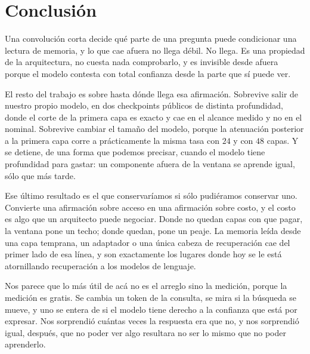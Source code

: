 \documentclass[11pt,a4paper]{article}
\begin{document}
\section{Conclusión}

Una convolución corta decide qué parte de una pregunta puede condicionar una lectura de memoria, y lo
que cae afuera no llega débil. No llega. Es una propiedad de la arquitectura, no cuesta nada
comprobarlo, y es invisible desde afuera porque el modelo contesta con total confianza desde la parte
que sí puede ver.

El resto del trabajo es sobre hasta dónde llega esa afirmación. Sobrevive salir de nuestro propio
modelo, en dos checkpoints públicos de distinta profundidad, donde el corte de la primera capa es
exacto y cae en el alcance medido y no en el nominal. Sobrevive cambiar el tamaño del modelo, porque
la atenuación posterior a la primera capa corre a prácticamente la misma tasa con $24$ y con $48$
capas. Y se detiene, de una forma que podemos precisar, cuando el modelo tiene profundidad para
gastar: un componente afuera de la ventana se aprende igual, sólo que más tarde.

Ese último resultado es el que conservaríamos si sólo pudiéramos conservar uno. Convierte una
afirmación sobre acceso en una afirmación sobre costo, y el costo es algo que un arquitecto puede
negociar. Donde no quedan capas con que pagar, la ventana pone un techo; donde quedan, pone un peaje.
La memoria leída desde una capa temprana, un adaptador o una única cabeza de recuperación cae del
primer lado de esa línea, y son exactamente los lugares donde hoy se le está atornillando recuperación
a los modelos de lenguaje.

Nos parece que lo más útil de acá no es el arreglo sino la medición, porque la medición es gratis. Se
cambia un token de la consulta, se mira si la búsqueda se mueve, y uno se entera de si el modelo tiene
derecho a la confianza que está por expresar. Nos sorprendió cuántas veces la respuesta era que no, y
nos sorprendió igual, después, que no poder ver algo resultara no ser lo mismo que no poder
aprenderlo.
\end{document}
